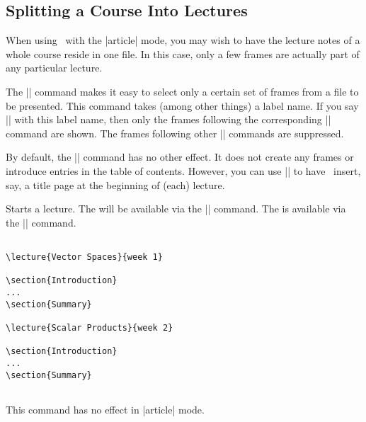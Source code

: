 \subsection{Splitting a Course Into Lectures}

When using \beamer\ with the |article| mode, you may wish to have the lecture notes of a whole course reside in one file. In this case, only a few frames are actually part of any particular lecture.

The |\lecture| command makes it easy to select only a certain set of frames from a file to be presented. This command takes (among other things) a label name. If you say || with this label name, then only the frames following the corresponding |\lecture| command are shown. The frames following other |\lecture| commands are suppressed.

By default, the |\lecture| command has no other effect. It does not create any frames or introduce entries in the table of contents. However, you can use |\AtBeginLecture| to have \beamer\ insert, say, a title page at the beginning of (each) lecture.

\begin{command}{\lecture{}}
  Starts a lecture. The  will be available via the |\insertlecture| command. The  is available via the |\insertshortlecture| command.

  \example
\begin{verbatim}

\lecture{Vector Spaces}{week 1}

\section{Introduction}
...
\section{Summary}

\lecture{Scalar Products}{week 2}

\section{Introduction}
...
\section{Summary}


\end{verbatim}

  \articlenote
  This command has no effect in |article| mode.
\end{command}

